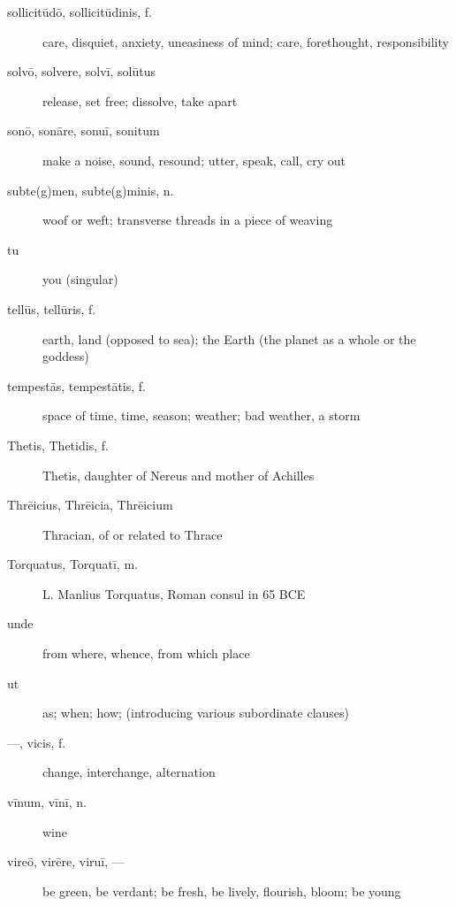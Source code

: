 \begin{description}
    \item[sollicitūdō, sollicitūdinis, f.] care, disquiet, anxiety, uneasiness
        of mind; care, forethought, responsibility
    \item[solvō, solvere, solvī, solūtus] release, set free; dissolve, take
        apart
    \item[sonō, sonāre, sonuī, sonitum] make a noise, sound, resound; utter,
        speak, call, cry out
    \item[subte(g)men, subte(g)minis, n.] woof or weft; transverse threads in
        a piece of weaving
    \item[tu] you (singular)
    \item[tellūs, tellūris, f.] earth, land (opposed to sea); the Earth (the
        planet as a whole or the goddess)
    \item[tempestās, tempestātis, f.] space of time, time, season; weather; bad
        weather, a storm
    \item[Thetis, Thetidis, f.] Thetis, daughter of Nereus and mother of
        Achilles
    \item[Thrēicius, Thrēicia, Thrēicium] Thracian, of or related to Thrace
    \item[Torquatus, Torquatī, m.] L. Manlius Torquatus, Roman consul in 65 BCE
    \item[unde] from where, whence, from which place
    \item[ut] as; when; how; (introducing various subordinate clauses)
    \item[---, vicis, f.] change, interchange, alternation
    \item[vīnum, vīnī, n.] wine
    \item[vireō, virēre, viruī, ---] be green, be verdant; be fresh, be lively,
        flourish, bloom; be young
\end{description}

